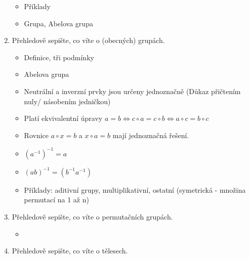 \documentclass[10pt,a4paper]{article}
\begin{document}
\begin{enumerate}
\begin{itemize}[label=$\circ$]
\item Příklady
\item Grupa, Abelova grupa
\end{itemize}


\item Přehledově sepište, co víte o (obecných) grupách.

\begin{itemize}[label=$\circ$]
\item Definice, tři podmínky
\item Abelova grupa
\item Neutrální a inverzní prvky jsou určeny jednoznačně (Důkaz přičtením nuly/ násobením jedničkou)
\item Platí ekvivalentní úpravy $a = b \iff c \circ a = c \circ b \iff a \circ c = b \circ c$
\item Rovnice $a \circ x = b$ a $x \circ a = b$ mají jednoznačná řešení.
\item $(a^{-1})^{-1} = a$
\item $(ab)^{-1} = (b^{-1}a^{-1})$ 
\item Příklady: aditivní grupy, multiplikativní, ostatní (symetrická - množina permutací na 1 až n)

\end{itemize}

\item Přehledově sepište, co víte o permutačních grupách. 

\begin{itemize}[label=$\circ$]
\item
\end{itemize}

\item Přehledově sepište, co víte o tělesech.


\end{enumerate}
\end{document}
